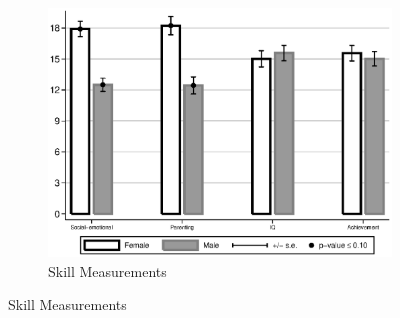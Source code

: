 \begin{figure}[!htbp]
\centering
\caption{Differences Between ABC/CARE Males and Females}
\label{fig:intro-gdiff-plots}
\begin{subfigure}[h]{0.55\textwidth}
	\centering
	\caption{Skill Measurements}
	\label{fig:intro-skills-plots-skills}
	\includegraphics[width=\textwidth]{output/abccare-gdiff-skills}
\end{subfigure}


\end{figure}
